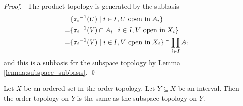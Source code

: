 \begin{proof}
    \pf\ The product topology is generated by the subbasis
    \begin{align*}
        & \{ {\pi_i}^{-1}(U) \mid i \in I, U \text{ open in } A_i \} \\
        = & \{ {\pi_i}^{-1}(V) \cap A_i \mid i \in I, V \text{ open in } X_i \} \\
        = & \{ {\pi_i}^{-1}(V) \mid i \in I, V \text{ open in } X_i \} \cap \prod_{i \in I} A_i
    \end{align*}
    and this is a subbasis for the subspace topology by Lemma \ref{lemma:subspace_subbasis}. \qed
\end{proof}

\begin{theorem}
    Let $X$ be an ordered set in the order topology. Let $Y \subseteq X$ be an interval. Then the order topology
    on $Y$ is the same as the subspace topology on $Y$.
\end{theorem}

